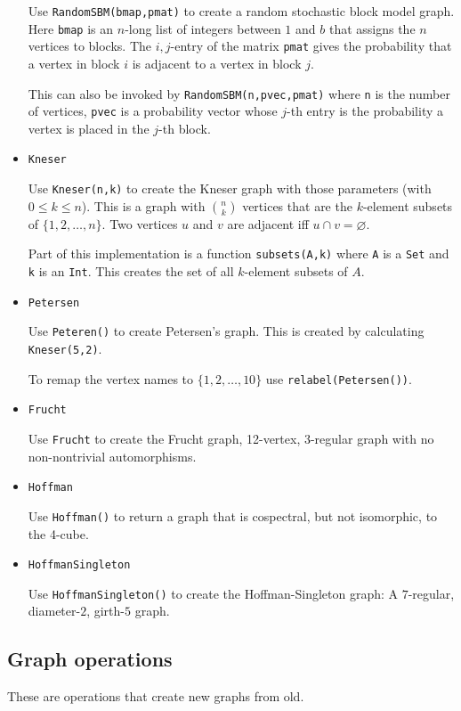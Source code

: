 \documentclass[oneside]{amsart}
\begin{document}
\begin{itemize}
  Use \verb|RandomSBM(bmap,pmat)| to create a random stochastic block
  model graph. Here \verb|bmap| is an $n$-long list of integers between
  $1$ and $b$ that assigns the $n$ vertices to blocks. The
  $i,j$-entry of the matrix \verb|pmat|
  gives the probability that a vertex in block $i$
  is adjacent to a vertex in block $j$.

  This can also be invoked by \verb|RandomSBM(n,pvec,pmat)| where
  \verb|n| is the number of vertices, \verb|pvec| is a probability vector
  whose $j$-th entry is the probability a vertex is placed in the $j$-th block.


\item \verb|Kneser|

  Use \verb|Kneser(n,k)| to create the Kneser graph with those
  parameters (with $0 \le k \le n$). This is a graph with $\binom nk$
  vertices that are the $k$-element subsets of $\{1,2,\ldots,n\}$. Two
  vertices $u$ and $v$ are adjacent iff $u \cap v = \varnothing$.

  Part of this implementation is a function \verb|subsets(A,k)| where
  \verb|A| is a \verb|Set| and \verb|k| is an \verb|Int|. This creates
  the set of all $k$-element subsets of $A$.


\item \verb|Petersen|

  Use \verb|Peteren()| to create Petersen's graph. This is created by
  calculating \verb|Kneser(5,2)|.

  To remap the vertex names to $\{1,2,\ldots,10\}$ use
  \verb|relabel(Petersen())|.

  \item \verb|Frucht|

    Use \verb|Frucht| to create the Frucht graph, 12-vertex, 3-regular graph with
    no non-nontrivial automorphisms.

  \item \verb|Hoffman|

    Use \verb|Hoffman()| to return a graph that is cospectral, but not
    isomorphic, to the 4-cube.

  \item \verb|HoffmanSingleton|

    Use \verb|HoffmanSingleton()| to create the Hoffman-Singleton graph:
    A $7$-regular, diameter-$2$, girth-$5$ graph.

  \end{itemize}


\subsection*{Graph operations}
These are operations that create new graphs from old.
\end{document}
